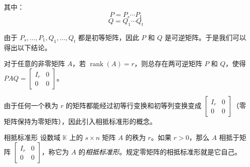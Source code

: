 其中：
$$
P = P_s \cdots P_1
$$$$
Q = Q_1 \cdots Q_t
$$

由于 $P_s, \ldots, P_1, Q_1, \ldots, Q_t$ 都是初等矩阵，因此 $P$ 和 $Q$ 是可逆矩阵。于是我们可以得出以下结论。

\begin{theorem}
	对于任意的非零矩阵 $A$，若 $\operatorname{rank}(A) = r$，则总存在两可逆矩阵 $P$ 和 $Q$，使得 $PAQ = \begin{bmatrix} I_r & 0 \\ 0 & 0 \end{bmatrix}$。
\end{theorem}

由于任何一个秩为 $r$ 的矩阵都能经过初等行变换和初等列变换变成 $\begin{bmatrix} I_r & 0 \\ 0 & 0 \end{bmatrix}$（零矩阵保持为零矩阵），因此引入相抵标准形的概念。

\begin{definition}{相抵标准形}
	设数域 $\mathbb K$ 上的 $s \times n$ 矩阵 $A$ 的秩为 $r$。如果 $r > 0$，那么 $A$ 相抵于矩阵 $\begin{bmatrix} I_r & 0 \\ 0 & 0 \end{bmatrix}$，称它为 $A$ 的\emph{相抵标准形}。规定零矩阵的相抵标准形就是它自己。
\end{definition}